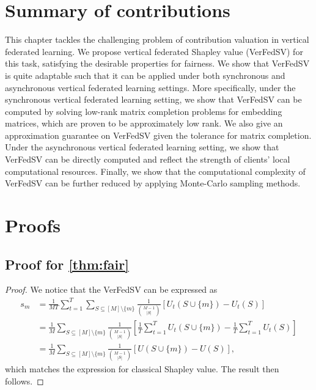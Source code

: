 \section{Summary of contributions} \label{sec:8-9}

This chapter tackles the challenging problem of contribution valuation in vertical federated learning. We propose vertical federated Shapley value (VerFedSV) for this task, satisfying the desirable properties for fairness. We show that VerFedSV is quite adaptable such that it can be applied under both synchronous and asynchronous vertical federated learning settings. More specifically, under the synchronous vertical federated learning setting, we show that VerFedSV can be computed by solving low-rank matrix completion problems for embedding matrices, which are proven to be approximately low rank. We also give an approximation guarantee on VerFedSV given the tolerance for matrix completion. Under the asynchronous vertical federated learning setting, we show that VerFedSV can be directly computed and reflect the strength of clients' local computational resources. Finally, we show that the computational complexity of VerFedSV can be further reduced by applying Monte-Carlo sampling methods.

\section{Proofs} \label{sec:8-10}

\subsection{Proof for \autoref{thm:fair}}
\begin{proof}
    We notice that the VerFedSV can be expressed as 
    \begin{align*}
        s_m &= \frac{1}{MT}\sum_{t=1}^T\sum_{S \subseteq [M] \setminus \{m\}} \frac{1}{\binom{M-1}{|S|}} [U_t(S\cup\{m\}) - U_t(S)]\\
        &= \frac{1}{M}\sum_{S \subseteq [M] \setminus \{m\}} \frac{1}{\binom{M-1}{|S|}} \left[\frac{1}{T}\sum_{t=1}^T U_t(S\cup\{m\}) - \frac{1}{T}\sum_{t=1}^T U_t(S)\right]\\
        &= \frac{1}{M}\sum_{S \subseteq [M] \setminus \{m\}} \frac{1}{\binom{M-1}{|S|}} \left[U(S\cup\{m\}) - U(S)\right],
    \end{align*}
    which matches the expression for classical Shapley value. The result then follows. 
\end{proof}

